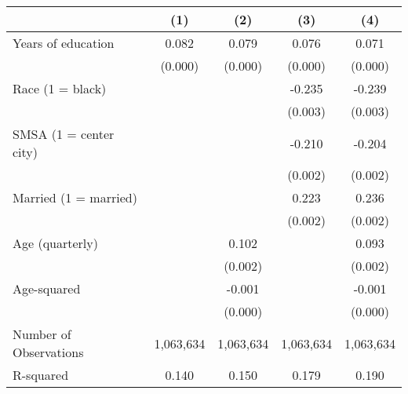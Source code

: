 {
\def\sym#1{\ifmmode^{#1}\else\(^{#1}\)\fi}
\begin{tabular}{l*{4}{c}}
\hline\hline
                    &\multicolumn{1}{c}{(1)}&\multicolumn{1}{c}{(2)}&\multicolumn{1}{c}{(3)}&\multicolumn{1}{c}{(4)}\\
\hline
Years of education  &       0.082&       0.079&       0.076&       0.071\\
                    &     (0.000)&     (0.000)&     (0.000)&     (0.000)\\
Race (1 = black)    &            &            &      -0.235&      -0.239\\
                    &            &            &     (0.003)&     (0.003)\\
SMSA (1 = center city)&            &            &      -0.210&      -0.204\\
                    &            &            &     (0.002)&     (0.002)\\
Married (1 = married)&            &            &       0.223&       0.236\\
                    &            &            &     (0.002)&     (0.002)\\
Age (quarterly)     &            &       0.102&            &       0.093\\
                    &            &     (0.002)&            &     (0.002)\\
Age-squared         &            &      -0.001&            &      -0.001\\
                    &            &     (0.000)&            &     (0.000)\\
\hline
Number of Observations&   1,063,634&   1,063,634&   1,063,634&   1,063,634\\
R-squared           &       0.140&       0.150&       0.179&       0.190\\
\hline\hline
\end{tabular}
}
